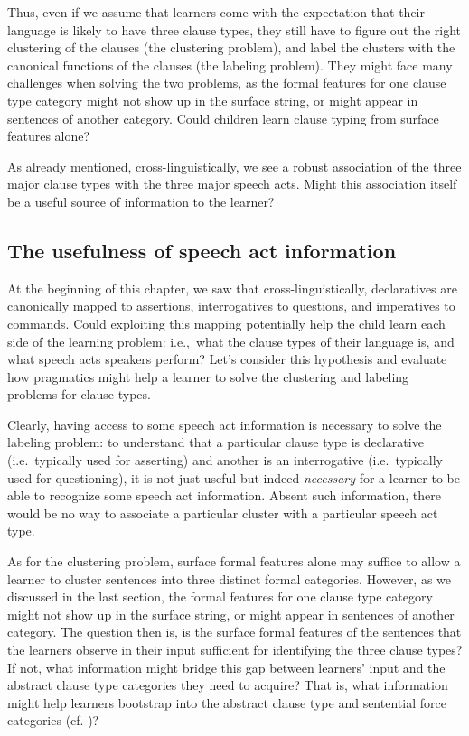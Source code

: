 Thus, even if we assume that learners come with the expectation that their language is likely to have three clause types, they still have to figure out the right clustering of the clauses (the clustering problem), and label the clusters with the canonical functions of the clauses (the labeling problem). They might face many challenges when solving the two problems, as the formal features for one clause type category might not show up in the surface string, or might appear in sentences of another category. Could children learn clause typing from surface features alone? 

As already mentioned, cross-linguistically, we see a robust association of the three major clause types with the three major speech acts. Might this association itself be a useful source of information to the learner?

\subsection{The usefulness of speech act information}
\label{sec:intro:cl:prag}

At the beginning of this chapter, we saw that cross-linguistically, declaratives are canonically mapped to assertions, interrogatives to questions, and imperatives to commands. Could exploiting this mapping potentially help the child learn each side of the learning problem: i.e.,~what the clause types of their language is, and what speech acts speakers perform? Let's consider this hypothesis and evaluate how pragmatics might help a learner to solve the clustering and labeling problems for clause types.

Clearly, having access to some speech act information is necessary to solve the labeling problem: to understand that a particular clause type is declarative (i.e.\ typically used for asserting) and another is an interrogative (i.e.\ typically used for questioning), it is not just useful but indeed \emph{necessary} for a learner to be able to recognize some speech act information. Absent such information, there would be no way to associate a particular cluster with a particular speech act type.

As for the clustering problem, surface formal features alone may suffice to allow a learner to cluster sentences into three distinct formal categories. However, as we discussed in the last section, the formal features for one clause type category might not show up in the surface string, or might appear in sentences of another category. The question then is, is the surface formal features of the sentences that the learners observe in their input sufficient for identifying the three clause types? If not, what information might bridge this gap between learners' input and the abstract clause type categories they need to acquire? That is, what information might help learners bootstrap into the abstract clause type and sentential force categories (cf. \cite{pinker1984, gleitman1990, hacquardlidz2018})? 

